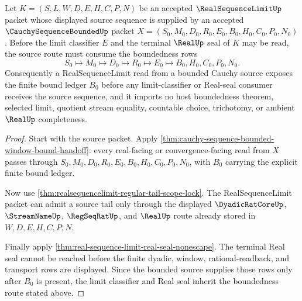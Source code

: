 \begin{theorem}\label{thm:realsequencelimit-cauchy-sequence-bounded-source-handoff}
Let $K=(S,L,W,D,E,H,C,P,N)$ be an accepted $\RealSequenceLimitUp$ packet whose displayed source sequence is supplied by an accepted $\CauchySequenceBoundedUp$ packet $X=(S_0,M_0,D_0,R_0,E_0,B_0,H_0,C_0,P_0,N_0)$. Before the limit classifier $E$ and the terminal $\RealUp$ seal of $K$ may be read, the source route must consume the boundedness rows
$$
S_0\longmapsto M_0\longmapsto D_0\longmapsto R_0\longmapsto E_0\longmapsto B_0,H_0,C_0,P_0,N_0 .
$$
Consequently a RealSequenceLimit read from a bounded Cauchy source exposes the finite bound ledger $B_0$ before any limit-classifier or Real-seal consumer receives the source sequence, and it imports no host boundedness theorem, selected limit, quotient stream equality, countable choice, trichotomy, or ambient $\RealUp$ completeness.
\end{theorem}
\begin{proof}
Start with the source packet. Apply \autoref{thm:cauchy-sequence-bounded-window-bound-handoff}: every real-facing or convergence-facing read from $X$ passes through $S_0,M_0,D_0,R_0,E_0,B_0,H_0,C_0,P_0,N_0$, with $B_0$ carrying the explicit finite bound ledger.

Now use \autoref{thm:realsequencelimit-regular-tail-scope-lock}. The RealSequenceLimit packet can admit a source tail only through the displayed $\DyadicRatCoreUp$, $\StreamNameUp$, $\RegSeqRatUp$, and $\RealUp$ route already stored in $W,D,E,H,C,P,N$.

Finally apply \autoref{thm:real-sequence-limit-real-seal-nonescape}. The terminal Real seal cannot be reached before the finite dyadic, window, rational-readback, and transport rows are displayed. Since the bounded source supplies those rows only after $B_0$ is present, the limit classifier and Real seal inherit the boundedness route stated above.
\end{proof}

